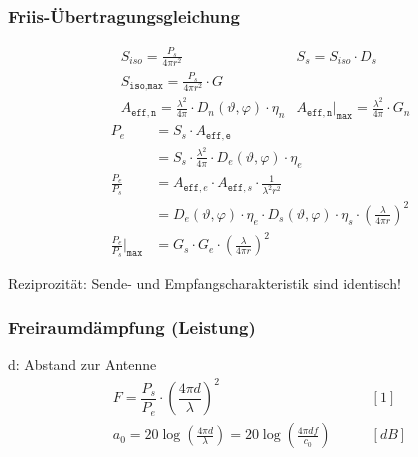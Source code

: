 \subsubsection{Friis-Übertragungsgleichung}
\begin{align*}
	 & S_{iso} = \frac{P_s}{4\pi r^2}                                                       & S_s = S_{iso} \cdot D_s                                                  \\
	 & S_{\texttt{iso,max}}=\frac{P_s}{4\pi r^2}\cdot G                                                                                                                \\
	 & A_{\mathtt{eff,n}} = \frac{\lambda^2}{4\pi}\cdot D_n(\vartheta, \varphi)\cdot \eta_n & A_{\mathtt{eff,n}}\Big|_{\mathtt{max}} = \frac{\lambda^2}{4\pi}\cdot G_n
\end{align*}
\begin{align*}
	P_e                                     & = S_s \cdot A_{\mathtt{eff,e}}                                                                                             \\
	                                        & =  S_s\cdot \frac{\lambda^2}{4\pi}\cdot D_e(\vartheta, \varphi)\cdot \eta_e                                                \\
	\frac{P_{e}}{P_{s}}                     & = A_{\texttt{eff},e}\cdot A_{\texttt{eff},s}\cdot\frac{1}{\lambda^2r^2}                                                    \\
	                                        & = D_e(\vartheta, \varphi)\cdot\eta_{e}\cdot D_s(\vartheta, \varphi)\cdot\eta_{s}\cdot\left(\frac{\lambda}{4\pi r}\right)^2 \\
	\frac{P_{e}}{P_{s}}\Big|_{\mathtt{max}} & = G_{s}\cdot G_{e}\cdot \left(\frac{\lambda}{4\pi r}\right)^2
\end{align*}

Reziprozität: Sende- und Empfangscharakteristik sind identisch!

\subsubsection{Freiraumdämpfung (Leistung)}
d: Abstand zur Antenne
\begin{align*}
	F = \dfrac{P_{s}}{P_{e}} \cdot \left(\dfrac{4 \pi d}{\lambda}\right)^2                             & \qquad [1]       \\
	a_{0} = 20 \log \left(\frac{4 \pi d}{\lambda}\right) =20 \log \left(\frac{4 \pi d f}{c_{0}}\right) & \qquad [\si{dB}]
\end{align*}


